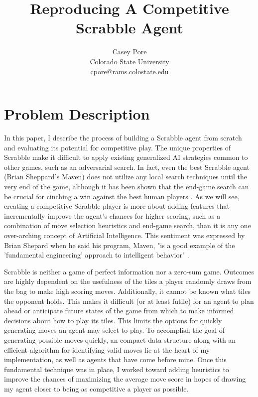 \documentclass[letterpaper]{article}
\title{Reproducing A Competitive Scrabble Agent}
\author{Casey Pore \\
Colorado State University\\
cpore@rams.colostate.edu\\
}
\begin{document}
\maketitle


\section{Problem Description}
In this paper, I describe the process of building a Scrabble agent from scratch and evaluating its potential for competitive play. The unique properties of Scrabble make it difficult to apply existing generalized AI strategies common to other games, such as an adversarial search. In fact, even the best Scrabble agent (Brian Sheppard's Maven) does not utilize any local search techniques until the very end of the game, although it has been shown that the end-game search can be crucial for cinching a win against the best human players \cite{1sheppard2002}. As we will see, creating a competitive Scrabble player is more about adding features that incrementally improve the agent's chances for higher scoring, such as a combination of move selection heuristics and end-game search, than it is any one over-arching concept of Artificial Intelligence. This sentiment was expressed by Brian Shepard when he said his program, Maven, "is a good example of the 'fundamental engineering' approach to intelligent behavior" \cite{1sheppard2002}.

Scrabble is neither a game of perfect information nor a zero-sum game. Outcomes are highly dependent on the usefulness of the tiles a player randomly draws from the bag to make high scoring moves. Additionally, it cannot be known what tiles the opponent holds. This makes it difficult (or at least futile) for an agent to plan ahead or anticipate future states of the game from which to make informed decisions about how to play its tiles. This limits the options for quickly generating moves an agent may select to play. To accomplish the goal of generating possible moves quickly, an compact data structure along with an efficient algorithm for identifying valid moves lie at the heart of my implementation, as well as agents that have come before mine. Once this fundamental technique was in place, I worked toward adding heuristics to improve the chances of maximizing the average move score in hopes of drawing my agent closer to being as competitive a player as possible.
\end{document}
